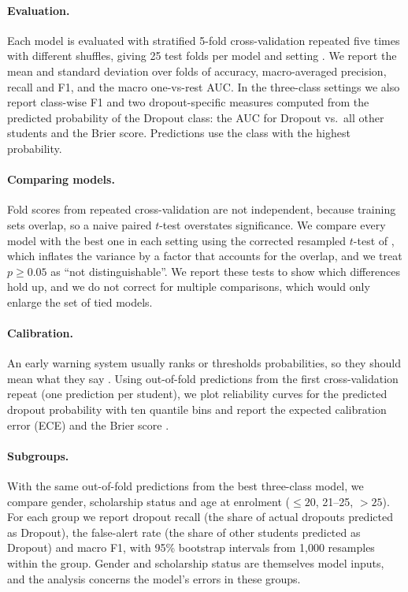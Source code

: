 \documentclass[11pt,a4paper]{article}
\begin{document}
\paragraph{Evaluation.} Each model is evaluated with stratified 5-fold cross-validation repeated five times with different shuffles, giving 25 test folds per model and setting \citep{kohavi1995}. We report the mean and standard deviation over folds of accuracy, macro-averaged precision, recall and F1, and the macro one-vs-rest AUC. In the three-class settings we also report class-wise F1 and two dropout-specific measures computed from the predicted probability of the Dropout class: the AUC for Dropout vs.\ all other students and the Brier score. Predictions use the class with the highest probability.

\paragraph{Comparing models.} Fold scores from repeated cross-validation are not independent, because training sets overlap, so a naive paired $t$-test overstates significance. We compare every model with the best one in each setting using the corrected resampled $t$-test of \citet{nadeau2003}, which inflates the variance by a factor that accounts for the overlap, and we treat $p\ge 0.05$ as ``not distinguishable''. We report these tests to show which differences hold up, and we do not correct for multiple comparisons, which would only enlarge the set of tied models.

\paragraph{Calibration.} An early warning system usually ranks or thresholds probabilities, so they should mean what they say \citep{niculescu2005}. Using out-of-fold predictions from the first cross-validation repeat (one prediction per student), we plot reliability curves for the predicted dropout probability with ten quantile bins and report the expected calibration error (ECE) and the Brier score \citep{guo2017}.

\paragraph{Subgroups.} With the same out-of-fold predictions from the best three-class model, we compare gender, scholarship status and age at enrolment ($\le 20$, 21--25, $>25$). For each group we report dropout recall (the share of actual dropouts predicted as Dropout), the false-alert rate (the share of other students predicted as Dropout) and macro F1, with 95\% bootstrap intervals from 1{,}000 resamples within the group. Gender and scholarship status are themselves model inputs, and the analysis concerns the model's errors in these groups.
\end{document}
